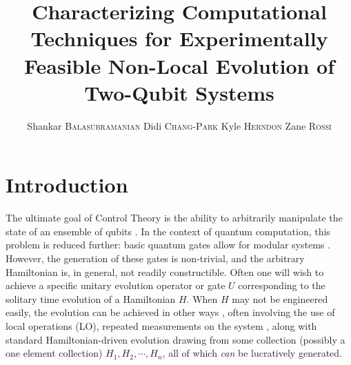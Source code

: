 \documentclass[11pt,twocolumn]{article}
\begin{document}

	\title{Characterizing Computational Techniques for Experimentally Feasible Non-Local Evolution of Two-Qubit Systems}
	\author{Shankar \textsc{Balasubramanian}\;\; Didi \textsc{Chang-Park}\;\; Kyle \textsc{Herndon}\;\; Zane \textsc{Rossi}}
	\date{}






\section{Introduction}

The ultimate goal of Control Theory is the ability to arbitrarily manipulate the state of an ensemble of qubits \cite{hammerer}. In the context of quantum computation, this problem is reduced further: basic quantum gates allow for modular systems \cite{bremner}. However, the generation of these gates is non-trivial, and the arbitrary Hamiltonian is, in general, not readily constructible. Often one will wish to achieve a specific unitary evolution operator or gate $U$ corresponding to the solitary time evolution of a Hamiltonian $H$. When $H$ may not be engineered easily, the evolution can be achieved in other ways \cite{bremner} , often involving the use of local operations (LO), repeated measurements on the system \cite{bennett}, along with standard Hamiltonian-driven evolution drawing from some collection (possibly a one element collection) $H_1, H_2, \cdots, H_n$, all of which \emph{can} be lucratively generated.
\end{document}
